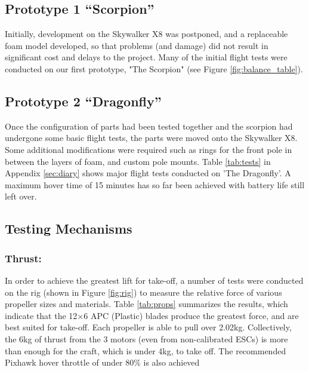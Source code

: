 
\subsection{Prototype 1 ``Scorpion''}
Initially, development on the Skywalker X8 was postponed, and a replaceable foam model developed, so that problems (and damage) did not result in significant cost and delays to the project. Many of the initial flight tests were conducted on our first prototype, "The Scorpion" (see Figure \ref{fig:balance_table}).

\subsection{Prototype 2 ``Dragonfly''}
Once the configuration of parts had been tested together and the scorpion had undergone some basic flight tests, the parts were moved onto the Skywalker X8. Some additional modifications were required such as rings for the front pole in between the layers of foam, and custom pole mounts. Table \ref{tab:tests} in Appendix \ref{sec:diary} shows major flight tests conducted on 'The Dragonfly'. A maximum hover time of 15 minutes has so far been achieved with battery life still left over.  

\subsection{Testing Mechanisms}
\subsubsection*{Thrust:} In order to achieve the greatest lift for take-off, a number of tests were conducted on the rig (shown in Figure \ref{fig:rig}) to measure the relative force of various propeller sizes and materials. Table \ref{tab:props} summarizes the results, which indicate that the 12$\times$6 APC (Plastic) blades produce the greatest force, and are best suited for take-off. Each propeller is able to pull over 2.02kg. Collectively, the 6kg of thrust from the 3 motors (even from non-calibrated ESCs) is more than enough for the craft, which is under 4kg, to take off. The recommended Pixhawk hover throttle of under 80\% is also achieved  

